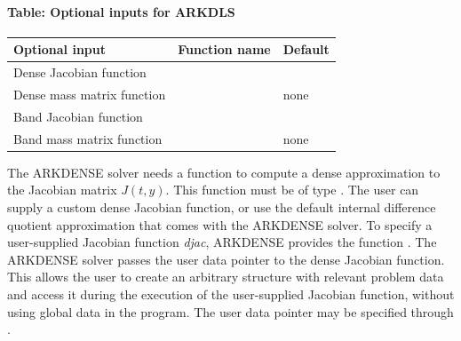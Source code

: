 \documentclass[letterpaper,10pt,english]{sphinxmanual}
\begin{document}
\paragraph{Table: Optional inputs for ARKDLS}
\label{c_interface/User_callable:table-optional-inputs-for-arkdls}
\begin{tabulary}{\linewidth}{|L|L|L|}
\hline
\textsf{\relax 
Optional input
} & \textsf{\relax 
Function name
} & \textsf{\relax 
Default
}\\
\hline
Dense Jacobian function
 & 
{\hyperref[c_interface/User_callable:c.ARKDlsSetDenseJacFn]{\emph{}}}
 & 
\\
\hline
Dense mass matrix function
 & 
{\hyperref[c_interface/User_callable:c.ARKDlsSetDenseMassFn]{\emph{}}}
 & 
none
\\
\hline
Band Jacobian function
 & 
{\hyperref[c_interface/User_callable:c.ARKDlsSetBandJacFn]{\emph{}}}
 & 
\\
\hline
Band mass matrix function
 & 
{\hyperref[c_interface/User_callable:c.ARKDlsSetBandMassFn]{\emph{}}}
 & 
none
\\
\hline\end{tabulary}


The ARKDENSE solver needs a function to compute a dense approximation
to the Jacobian matrix \(J(t,y)\). This function must be of type
{\hyperref[c_interface/User_supplied:c.ARKDlsDenseJacFn]{\emph{}}}.  The user can supply a custom dense
Jacobian function, or use the default internal difference quotient
approximation that comes with the ARKDENSE solver.  To specify a
user-supplied Jacobian function \emph{djac}, ARKDENSE provides the
function {\hyperref[c_interface/User_callable:c.ARKDlsSetDenseJacFn]{\emph{}}}. The ARKDENSE solver
passes the user data pointer to the dense Jacobian function. This
allows the user to create an arbitrary structure with relevant problem
data and access it during the execution of the user-supplied Jacobian
function, without using global data in the program. The user
data pointer may be specified through {\hyperref[c_interface/User_callable:c.ARKodeSetUserData]{\emph{}}}.
\end{document}
